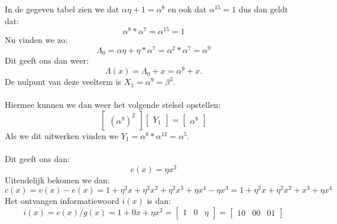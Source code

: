 \documentclass[11pt,a4paper,titlepage]{article}
\begin{document}
In de gegeven tabel zien we dat $\alpha\eta + 1 = \alpha ^8 $ en ook dat $\alpha ^{15} = 1$ dus dan geldt dat:
		$$\alpha ^8 * \alpha ^7 = \alpha ^{15} = 1$$
Nu vinden we zo:
	$$\Lambda_0 = \alpha\eta + \eta * \alpha ^7 = \alpha ^2 * \alpha ^7 = \alpha ^9 $$
\noindent Dit geeft ons dan weer:
	$$\Lambda (x) = \Lambda _0 + x =  \alpha ^9 + x.$$
De nulpunt van deze veelterm is $X_1 = \alpha ^9 = \beta ^3$.\\ \\
Hiermee kunnen we dan weer het volgende stelsel opstellen:
		$$\begin{bmatrix}(\alpha^9)^2\end{bmatrix} \begin{bmatrix}Y_1\end{bmatrix} = \begin{bmatrix}\alpha ^8\end{bmatrix} $$
Als we dit uitwerken vinden we $Y _1 = \alpha ^8 * \alpha ^{12} = \alpha ^5$.\\ \\
Dit geeft ons dan:
	$$e(x) = \eta x^3$$
Uitendelijk bekomen we dan:
	$$c(x) = v(x) - e(x) = 1 + \eta^2 x + \eta^2 x^2 + \eta^2 x^3 + \eta x^4 - \eta x^3 = 1 + \eta^2 x + \eta^2 x^2 + x^3 + \eta x^4$$
Het ontvangen informatiewoord $i(x)$ is dan:
	$$i(x) = c(x)/g(x) = 1 + 0x + \eta x^2 = \begin{bmatrix}1 & 0 & \eta\end{bmatrix} = \begin{bmatrix}10 & 00 & 01\end{bmatrix} $$
\end{document}
